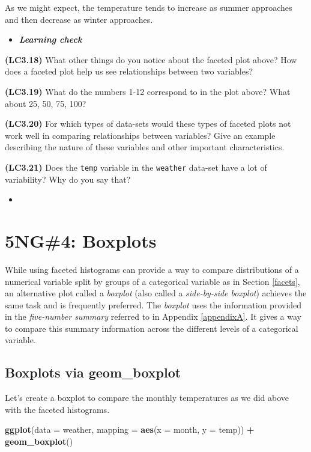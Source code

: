 \documentclass[12pt,]{krantz}
\makeatletter
\newenvironment{Shaded}{\begin{snugshade}}{\end{snugshade}}
\newcommand{\KeywordTok}[1]{\textcolor[rgb]{0.27,0.27,0.27}{\textbf{#1}}}
\newcommand{\DataTypeTok}[1]{\textcolor[rgb]{0.27,0.27,0.27}{#1}}
\newcommand{\StringTok}[1]{\textcolor[rgb]{0.5,0.5,0.5}{#1}}
\newcommand{\OperatorTok}[1]{\textcolor[rgb]{0.43,0.43,0.43}{\textbf{#1}}}
\newcommand{\NormalTok}[1]{#1}
\newenvironment{kframe}{%
\medskip{}
\setlength{\fboxsep}{.8em}
 \def\at@end@of@kframe{}%
 \ifinner\ifhmode%
  \def\at@end@of@kframe{\end{minipage}}%
  \begin{minipage}{\columnwidth}%
 \fi\fi%
 \def\FrameCommand##1{\hskip\@totalleftmargin \hskip-\fboxsep
 \colorbox{shadecolor}{##1}\hskip-\fboxsep
     \hskip-\linewidth \hskip-\@totalleftmargin \hskip\columnwidth}%
 \MakeFramed {\advance\hsize-\width
   \@totalleftmargin\z@ \linewidth\hsize
   \@setminipage}}%
 {\par\unskip\endMakeFramed%
 \at@end@of@kframe}
\renewenvironment{Shaded}{\begin{kframe}}{\end{kframe}}
\newenvironment{rmdblock}[1]
  {\begin{shaded*}
  \begin{itemize}
  \renewcommand{\labelitemi}{
    \raisebox{-.7\height}[0pt][0pt]{
    }
  }
  \item
  }
  {
  \end{itemize}
  \end{shaded*}
  }
\newenvironment{learncheck}
  {\begin{rmdblock}{warning}}
  {\end{rmdblock}}
\theoremstyle{definition}
\theoremstyle{definition}
\theoremstyle{definition}
\theoremstyle{remark}
\makeatother
\begin{document}
As we might expect, the temperature tends to increase as summer
approaches and then decrease as winter approaches.

\begin{learncheck}
\textbf{\emph{Learning check}}
\end{learncheck}

\textbf{(LC3.18)} What other things do you notice about the faceted plot
above? How does a faceted plot help us see relationships between two
variables?

\textbf{(LC3.19)} What do the numbers 1-12 correspond to in the plot
above? What about 25, 50, 75, 100?

\textbf{(LC3.20)} For which types of data-sets would these types of
faceted plots not work well in comparing relationships between
variables? Give an example describing the nature of these variables and
other important characteristics.

\textbf{(LC3.21)} Does the \texttt{temp} variable in the
\texttt{weather} data-set have a lot of variability? Why do you say
that?

\begin{learncheck}

\end{learncheck}

\section{5NG\#4: Boxplots}\label{boxplots}

While using faceted histograms can provide a way to compare
distributions of a numerical variable split by groups of a categorical
variable as in Section \ref{facets}, an alternative plot called a
\emph{boxplot} (also called a \emph{side-by-side boxplot}) achieves the
same task and is frequently preferred. The \emph{boxplot} uses the
information provided in the \emph{five-number summary} referred to in
Appendix \ref{appendixA}. It gives a way to compare this summary
information across the different levels of a categorical variable.

\subsection{Boxplots via geom\_boxplot}\label{geomboxplot}

Let's create a boxplot to compare the monthly temperatures as we did
above with the faceted histograms.

\begin{Shaded}
\begin{Highlighting}[]
\KeywordTok{ggplot}\NormalTok{(}\DataTypeTok{data =}\NormalTok{ weather, }\DataTypeTok{mapping =} \KeywordTok{aes}\NormalTok{(}\DataTypeTok{x =}\NormalTok{ month, }\DataTypeTok{y =}\NormalTok{ temp)) }\OperatorTok{+}
\StringTok{  }\KeywordTok{geom_boxplot}\NormalTok{()}
\end{Highlighting}
\end{Shaded}
\end{document}
